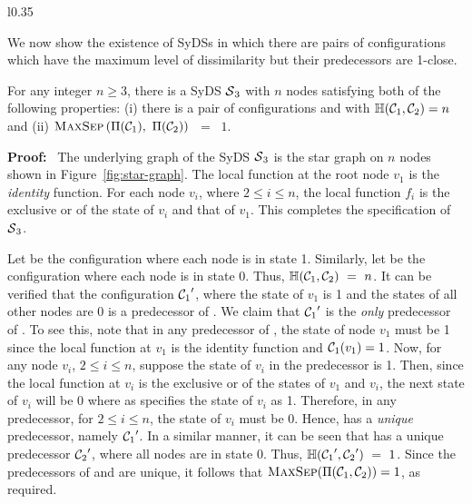 \smallskip

\begin{wrapfigure}[9]{l}{0.35\textwidth}
\centering

\caption{\small{Star graph used in the proof of
Proposition~\ref{pro:far-close}.}}
\label{fig:star-graph}
\smallskip
\end{wrapfigure}
We now show the existence of SyDSs in which there 
are pairs of configurations which have the maximum level 
of dissimilarity but their predecessors are 1-close. 

\begin{proposition}\label{pro:far-close}
For any integer $n \geq 3$,
there is a SyDS $\mbox{$\mathcal{S}$}_3${} with $n$
nodes satisfying both of the following properties: 
(i) there is a pair of configurations
\calcone{} and \calctwo{} with $\mbox{$\mathbb{H}$}(\mbox{$\mathcal{C}_{1}$}, \mbox{$\mathcal{C}_{2}$}) = n$  and 
(ii) $\mbox{\textsc{MaxSep}}\left( \mbox{$\Pi(\mbox{$\mathcal{C}_{1}$})$},~ \mbox{$\Pi(\mbox{$\mathcal{C}_{2}$})$} \right)$ ~=~ $1$.
\end{proposition}

\noindent
\textbf{Proof:}~ The underlying graph of the SyDS $\mbox{$\mathcal{S}$}_3$ is
the star graph on $n$ nodes shown in Figure~\ref{fig:star-graph}.
The local function at the root node $v_1$ is the \emph{identity}
function.
For each node $v_i$, where $2 \leq i \leq n$, the local function
$f_i$ is the exclusive or of the state of $v_i$ and that of $v_1$.  
This completes the specification of $\mbox{$\mathcal{S}$}_3$.

Let \calcone{} be the configuration where each node is in state 1.
Similarly, let \calctwo{} be the configuration where each node is in state 0.
Thus, $\mbox{$\mathbb{H}$}(\mbox{$\mathcal{C}_{1}$}, \mbox{$\mathcal{C}_{2}$}) ~=~ n$.
It can be verified that the configuration
$\mbox{$\mathcal{C}_{1}$}'$, 
where the state of $v_1$ is 1 and the states of all other
nodes are 0 is a predecessor of \calcone.
We claim that $\mbox{$\mathcal{C}_{1}$}'$ is the \emph{only} predecessor of \calcone.
To see this, note that  in any predecessor of \calcone, 
the state of node $v_1$ must be 1
since the local function at $v_1$ is the 
identity function and $\mbox{$\mathcal{C}_{1}$}(v_1) = 1$.
Now, for any node $v_i$, $2 \leq i \leq n$, 
suppose the state of $v_i$ in the predecessor is 1. 
Then, since the local function at $v_i$ is the exclusive or of the states of $v_1$
and $v_i$, the next state of $v_i$ will be 0 where as \calcone{} specifies
the state of $v_i$ as 1. 
Therefore, in any predecessor, for $2 \leq i \leq n$, the state of $v_i$ must be 0.
Hence, \calcone{} has a \emph{unique} predecessor, namely $\mbox{$\mathcal{C}_{1}$}'$.
In a similar manner, it can be seen that \calctwo{} has a unique predecessor 
$\mbox{$\mathcal{C}_{2}$}'$, where all nodes are in state 0.
Thus, $\mbox{$\mathbb{H}$}(\mbox{$\mathcal{C}_{1}$}', \mbox{$\mathcal{C}_{2}$}') ~=~ 1$.
Since the predecessors of \calcone{} and \calctwo{} are unique,
it follows that $\mbox{\textsc{MaxSep}}(\Pi(\mbox{$\mathcal{C}_{1}$}, \mbox{$\mathcal{C}_{2}$})) = 1$, as required. \QED

